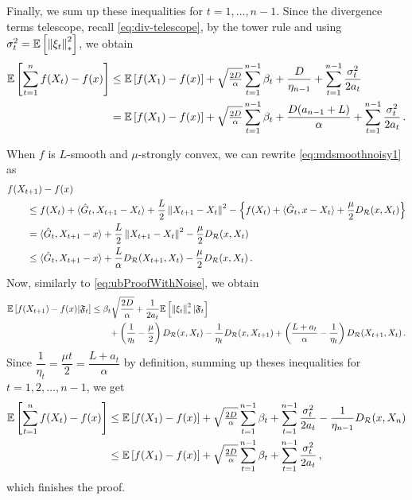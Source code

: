 Finally, we sum up these inequalities for $t=1,\dots,n-1$. Since the divergence terms telescope, recall \eqref{eq:div-telescope},
by the tower rule and using $\sigma_t^2 = \mathbb{E}\left[ \left\|\xi_t\right\|_*^2\right]$, we obtain
\begin{align*}
 \mathbb{E}\left[ \sum_{t=1}^n f(X_t) - f(x) \right]
& \le
  \mathbb{E}\left[f(X_1)-f(x)\right] + \sqrt{\tfrac{2D}{\alpha}} \sum_{t=1}^{n-1} \beta_t +
	   \frac{D}{\eta_{n-1}} +
	  \sum_{t=1}^{n-1}\frac{\sigma_t^2}{2a_t}\\
&=
  \mathbb{E}\left[f(X_1)-f(x)\right] + \sqrt{\tfrac{2D}{\alpha}} \sum_{t=1}^{n-1} \beta_t +
	   \frac{D(a_{n-1}+L)}{\alpha} +
	  \sum_{t=1}^{n-1}\frac{\sigma_t^2}{2a_t}\,.
\end{align*}

When $f$ is $L$-smooth and $\mu$-strongly convex,  we can rewrite \eqref{eq:mdsmoothnoisy1} as
\begin{align*}
\MoveEqLeft
f(X_{t+1}) - f(x) \nonumber\\
 &\le f(X_t) + \ip{ \hat{G}_t, X_{t+1}-X_t } + \frac{L}{2} \norm{X_{t+1}-X_t}^2 - \left\{ f(X_t) + \ip{ \hat{G}_t, x-X_t}+\dfrac{\mu}{2}\DR(x, X_t) \right\} \nonumber \\
 &= \ip{\hat{G}_t, X_{t+1} - x } +  \frac{L}{2} \norm{X_{t+1}-X_t}^2-\dfrac{\mu}{2}\DR(x, X_t) \nonumber\\
 &\le \ip{\hat{G}_t,X_{t+1}-x} + \frac{L}{\alpha} D_{\mathcal{R}}(X_{t+1},X_t)-\dfrac{\mu}{2}\DR(x, X_t)\,.
\end{align*}
Now, similarly to \eqref{eq:ubProofWithNoise}, we  obtain
\begin{align*}
\mathbb{E}\left[f(X_{t+1}) - f(x) |\mathfrak{F}_{t} \right]
& \le
 \beta_t \sqrt{ \frac{2D}{\alpha} }+
\frac{1}{2a_t}  \mathbb{E}\left[\left\|\xi_t\right\|_*^2|\mathfrak{F}_{t}\right]\\
&\qquad +\left(\dfrac{1}{\eta_t}-\dfrac{\mu}{2}  \right)D_{\mathcal{R}}(x,X_t)-\dfrac{1}{\eta_t}D_{\mathcal{R}}(x,X_{t+1})
+\left( \dfrac{L+a_t}{\alpha}-\dfrac{1}{\eta_t} \right)D_{\mathcal{R}}(X_{t+1},X_t) \,.
\end{align*}
Since $\dfrac{1}{\eta_t}=\dfrac{\mu t}{2}=\dfrac{L+a_t}{\alpha}$ by definition, summing up theses inequalities for $t=1,2,\ldots,n-1$, we get
\begin{align*}
 \mathbb{E}\left[ \sum_{t=1}^n f(X_t) - f(x) \right]
& \le
  \mathbb{E}\left[f(X_1)-f(x)\right] + \sqrt{\tfrac{2D}{\alpha}} \sum_{t=1}^{n-1} \beta_t +
	  \sum_{t=1}^{n-1}\frac{\sigma_t^2}{2a_t}-\dfrac{1}{\eta_{n-1}}D_{\mathcal{R}}(x,X_{n})\\
& \le
  \mathbb{E}\left[f(X_1)-f(x)\right] + \sqrt{\tfrac{2D}{\alpha}} \sum_{t=1}^{n-1} \beta_t +
	  \sum_{t=1}^{n-1}\frac{\sigma_t^2}{2a_t}\,,
\end{align*}
which finishes the proof.



